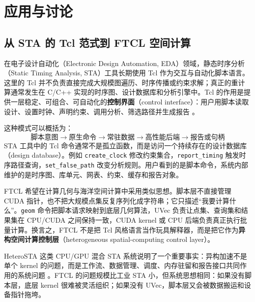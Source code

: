 ﻿\chapter{应用与讨论}

\section{从 STA 的 Tcl 范式到 FTCL 空间计算}
在电子设计自动化（Electronic Design Automation, EDA）领域，静态时序分析（Static Timing Analysis, STA）工具长期使用 Tcl 作为交互与自动化脚本语言。这里的 Tcl 并不负责直接完成大规模图遍历、时序传播或约束求解；真正的重计算通常发生在 C/C++ 实现的时序图、设计数据库和分析引擎中。Tcl 的作用是提供一层稳定、可组合、可自动化的\textbf{控制界面}（control interface）：用户用脚本读取设计、设置时钟、声明约束、调用分析、筛选路径并生成报告 \cite{ousterhout1994tcl,tcldocs}。

这种模式可以概括为：
\[
  \text{脚本意图}
  \rightarrow
  \text{原生命令}
  \rightarrow
  \text{常驻数据}
  \rightarrow
  \text{高性能后端}
  \rightarrow
  \text{报告或句柄}
\]
STA 工具中的 Tcl 命令通常不是孤立函数，而是访问一个持续存在的设计数据库（design database）。例如 \texttt{create\_clock} 修改约束集合，\texttt{report\_timing} 触发时序路径查询，\texttt{set\_false\_path} 改变分析规则。用户看到的是脚本命令，系统内部维护的是时序图、库单元、网表、约束、缓存和报告对象。

FTCL 希望在计算几何与海洋空间计算中采用类似思想。脚本层不直接管理 CUDA 指针，也不把大规模点集反复序列化成字符串；它只描述“我要计算什么”。\texttt{geom} 命令把脚本请求映射到底层几何算法，UVec 负责让点集、查询集和结果集在 CPU/CUDA 之间保持一致，CUDA kernel 或 CPU 后端负责真正执行批量计算。换言之，FTCL 不是把 Tcl 风格语言当作玩具解释器，而是把它作为\textbf{异构空间计算控制层}（heterogeneous spatial-computing control layer）。

HeteroSTA 这类 CPU/GPU 混合 STA 系统说明了一个重要事实：异构加速不是单个 kernel 的问题，而是工作流、数据管理、调度、内存驻留和报告接口共同作用的系统问题 \cite{guo2026heterosta}。FTCL 的问题规模比工业 STA 小，但系统思想相同：如果没有脚本层，底层 kernel 很难被灵活组织；如果没有 UVec，脚本层又会被数据搬运和设备指针拖垮。

